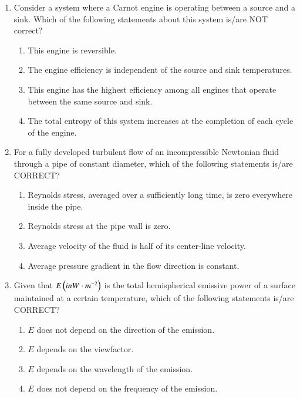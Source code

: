 \documentclass[journal,12pt,onecolumn]{IEEEtran}
\theoremstyle{remark}
\begin{document}
\begin{enumerate}
    \item Consider a system where a Carnot engine is operating between a source and a sink. Which of the following statements about this system is/are NOT correct?

\hfill{}
\begin{enumerate}
    \item This engine is reversible.
    \item The engine efficiency is independent of the source and sink temperatures.
    \item This engine has the highest efficiency among all engines that operate between the same source and sink.
    \item The total entropy of this system increases at the completion of each cycle of the engine.
\end{enumerate}

    \item For a fully developed turbulent flow of an incompressible Newtonian fluid through a pipe of constant diameter, which of the following statements is/are CORRECT?

\hfill{}
\begin{enumerate}
    \item Reynolds stress, averaged over a sufficiently long time, is zero everywhere inside the pipe.
    \item Reynolds stress at the pipe wall is zero.
    \item Average velocity of the fluid is half of its center-line velocity.
    \item Average pressure gradient in the flow direction is constant.
\end{enumerate}

    \item Given that $E\left(in W\cdot m^{-2}\right)$ is the total hemispherical emissive power of a surface maintained at a certain temperature, which of the following statements is/are CORRECT?

\hfill{}
\begin{enumerate}
    \item $E$ does not depend on the direction of the emission.
    \item $E$ depends on the viewfactor.
    \item $E$ depends on the wavelength of the emission.
    \item $E$ does not depend on the frequency of the emission.
\end{enumerate}


\end{enumerate}
\end{document}
